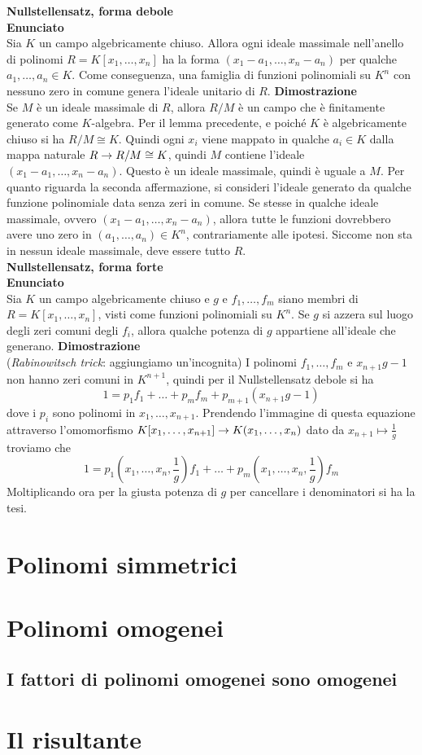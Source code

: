 \documentclass[a4paper,NoNotes,GeneralMath]{stdmdoc}
\newcommand{\Enunciato}{\vskip 0.05cm \noindent \textbf{Enunciato} \\ }
\renewcommand{\Dimostrazione}{\vskip 0.05cm \noindent \textbf{Dimostrazione} \\ }
\begin{document}
	{\bf Nullstellensatz, forma debole} \\
	\Enunciato Sia $K$ un campo algebricamente chiuso. Allora ogni ideale massimale nell'anello di polinomi $R = K[x_1, \ldots, x_n]$ ha la forma $(x_1-a_1, \ldots, x_n-a_n)$ per qualche $a_1, \ldots, a_n \in K$. Come conseguenza, una famiglia di funzioni polinomiali su $K^n$ con nessuno zero in comune genera l'ideale unitario di $R$.
	\Dimostrazione Se $M$ è un ideale massimale di $R$, allora $R/M$ è un campo che è finitamente generato come $K$-algebra. Per il lemma precedente, e poiché $K$ è algebricamente chiuso si ha $R/M \cong K$. Quindi ogni $x_i$ viene mappato in qualche $a_i \in K$ dalla mappa naturale $R \rightarrow R/M \cong K$, quindi $M$ contiene l'ideale $(x_1-a_1, \ldots, x_n-a_n)$. Questo è un ideale massimale, quindi è uguale a $M$. Per quanto riguarda la seconda affermazione, si consideri l'ideale generato da qualche funzione polinomiale data senza zeri in comune. Se stesse in qualche ideale massimale, ovvero $(x_1-a_1, \ldots, x_n-a_n)$, allora tutte le funzioni dovrebbero avere uno zero in $(a_1, \ldots, a_n) \in K^n$, contrariamente alle ipotesi. Siccome non sta in nessun ideale massimale, deve essere tutto $R$. \\

	{\bf Nullstellensatz, forma forte} \\
	\Enunciato Sia $K$ un campo algebricamente chiuso e $g$ e $f_1, \ldots, f_m$ siano membri di $R = K[x_1, \ldots, x_n]$, visti come funzioni polinomiali su $K^n$. Se $g$ si azzera sul luogo degli zeri comuni degli $f_i$, allora qualche potenza di $g$ appartiene all'ideale che generano.
	\Dimostrazione ({\it Rabinowitsch trick}: aggiungiamo un'incognita) I polinomi $f_1, \ldots, f_m$ e $x_{n+1}g-1$ non hanno zeri comuni in $K^{n+1}$, quindi per il Nullstellensatz debole si ha $$ 1 = p_1 f_1 + \ldots + p_m f_m + p_{m+1} (x_{n+1}g-1) $$ dove i $p_i$ sono polinomi in $x_1, \ldots, x_{n+1}$. Prendendo l'immagine di questa equazione attraverso l'omomorfismo $K[x_1, \ldots, x_{n+1}] \rightarrow K(x_1, \ldots, x_n)$ dato da $x_{n+1} \mapsto \frac{1}{g}$ troviamo che $$ 1 = p_1(x_1, \ldots, x_n, \frac{1}{g}) f_1 + \ldots + p_m(x_1, \ldots, x_n, \frac{1}{g}) f_m$$ Moltiplicando ora per la giusta potenza di $g$ per cancellare i denominatori si ha la tesi.

	\section*{Polinomi simmetrici}

	\section*{Polinomi omogenei}
	\subsection{I fattori di polinomi omogenei sono omogenei}

	\section*{Il risultante}
\end{document}
